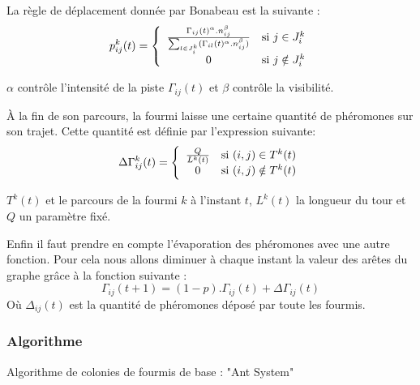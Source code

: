 \documentclass[12pt]{article}
\begin{document}
La règle de déplacement donnée par Bonabeau\cite{fourmis} est la suivante :
\[
p^k_{ij}(t) = 
\left\{\begin{array}{cc}
\frac{\Gamma_{ij}(t)^\alpha . n_{ij}^\beta}{\sum_{l\in J^k_i} (\Gamma_{il}(t)^\alpha . n_{ij}^\beta)} &
\textnormal{si }j\in J_i^k \\
0 & \textnormal{si }j\notin J_i^k
\end{array}
\right.
\]

$\alpha$ contrôle l'intensité de la piste $\Gamma_{ij}(t)$ et $\beta$ contrôle la visibilité.

À la fin de son parcours, la fourmi laisse une certaine quantité de phéromones sur son trajet. Cette quantité est définie par l'expression suivante:
\[
\Delta\Gamma^k_{ij}(t) = 
\left\{\begin{array}{cc}
\frac{Q}{L^k(t)} &
\textnormal{si }(i,j)\in T^k(t) \\
0 & \textnormal{si }(i,j)\notin T^k(t)
\end{array}
\right.
\]

$T^k(t)$ et le parcours de la fourmi $k$ à l'instant $t$, $L^k(t)$ la longueur du tour et $Q$ un paramètre fixé.

Enfin il faut prendre en compte l'évaporation des phéromones avec une autre fonction. Pour cela nous allons diminuer à chaque instant la valeur des arêtes du graphe grâce à la fonction suivante :
$$
\Gamma_{ij}(t+1) = (1-p).\Gamma_{ij}(t) + \Delta\Gamma_{ij}(t)
$$
Où $\Delta_{ij}(t)$ est la quantité de phéromones déposé par toute les fourmis.

\newpage
\subsubsection{Algorithme}

\begin{algorithm}
    \caption{Algorithme de colonies de fourmis de base : "Ant System"}
    \begin{algorithmic}
            \ENDFOR
          \ENDFOR
      	\ENDFOR
    \end{algorithmic}
    \end{algorithm}
\end{document}
